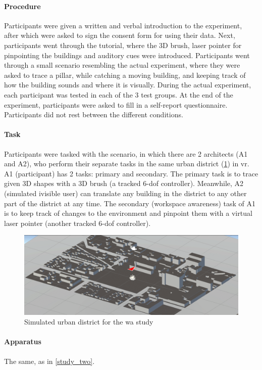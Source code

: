 \paragraph{Procedure}
Participants were given a written and verbal introduction to the experiment,
after which were asked to sign the consent form for using their data.
Next, participants went through the tutorial, where the 3D brush, laser pointer for pinpointing the buildings and auditory cues were introduced. Participants went through a small scenario resembling the actual experiment, where they were asked to trace a pillar, while catching a moving building, and keeping track of how the building sounds and where it is visually.
During the actual experiment, each participant was tested in each of the 3 test groups.
At the end of the experiment, participants were asked to fill in a self-report questionnaire.
Participants did not rest between the different conditions. 

\paragraph{Task}
Participants were tasked with the scenario, in which there are 2 architects (A1 and A2), who perform their separate tasks in the same urban district (\ref{fig:urbandistrict}) in \gls{vr}. A1 (participant) has 2 tasks: primary and secondary. The primary task is to trace given 3D shapes with a 3D brush (a tracked 6-\gls{dof} controller). Meanwhile, A2 (simulated ivisible user) can translate any building in the district to any other part of the district at any time. The secondary (workspace awareness) task of A1 is to keep track of changes to the environment and pinpoint them with a virtual laser pointer (another tracked 6-\gls{dof} controller).

\begin{figure}
	\centering
	\includegraphics[width=0.7\linewidth]{figures/urban_district}
	\caption{Simulated urban district for the \gls{wa} study}
	\label{fig:urbandistrict}
\end{figure}


\paragraph{Apparatus} The same, as in \ref{study_two}.

